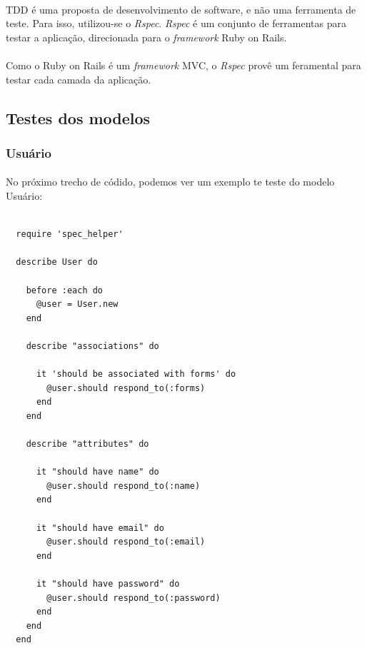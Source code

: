\documentclass[11pt]{article}
\begin{document}
    \paragraph{}

    TDD é uma proposta de desenvolvimento de software, e não uma 
    ferramenta de teste. Para isso, utilizou-se o {\em Rspec}. {\em Rspec}
    é um conjunto de ferramentas para testar a aplicação, direcionada para o
    {\em framework} Ruby on Rails.
    
    \paragraph{}
    
    Como o Ruby on Rails é um {\em framework} MVC, o {\em Rspec} provê um
    feramental para testar cada camada da aplicação.
        
  \clearpage
    
    \subsection{Testes dos modelos}
    
    \subsubsection{Usuário}
      
    \paragraph{}
    No próximo trecho de códido, podemos ver um exemplo te teste do modelo
    Usuário:
    
    {\scriptsize
      \lstset{language=Ruby}
      \begin{lstlisting}

  require 'spec_helper'

  describe User do

    before :each do
      @user = User.new
    end

    describe "associations" do
    
      it 'should be associated with forms' do
        @user.should respond_to(:forms)
      end
    end

    describe "attributes" do

      it "should have name" do
        @user.should respond_to(:name)
      end

      it "should have email" do
        @user.should respond_to(:email)
      end

      it "should have password" do
        @user.should respond_to(:password)
      end
    end
  end
      \end{lstlisting}
    }
    
\end{document}
